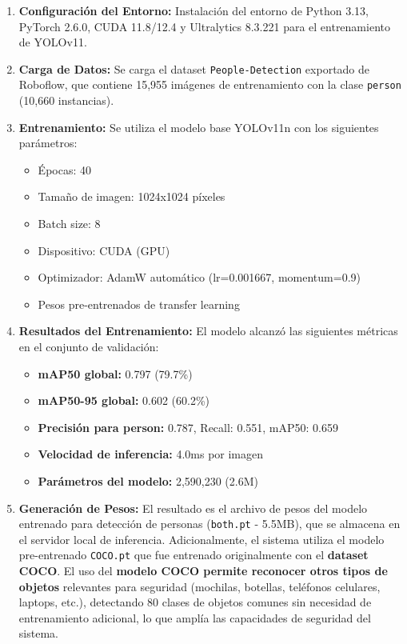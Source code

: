 \documentclass[12pt, a4paper]{article}
\begin{document}
\begin{enumerate}
\item \textbf{Configuración del Entorno:} Instalación del entorno de Python 3.13, PyTorch 2.6.0, CUDA 11.8/12.4 y Ultralytics 8.3.221 para el entrenamiento de YOLOv11.
\item \textbf{Carga de Datos:} Se carga el dataset \texttt{People-Detection} exportado de Roboflow, que contiene 15,955 imágenes de entrenamiento con la clase \texttt{person} (10,660 instancias).
\item \textbf{Entrenamiento:} Se utiliza el modelo base YOLOv11n con los siguientes parámetros:
\begin{itemize}
\item Épocas: 40
\item Tamaño de imagen: 1024x1024 píxeles
\item Batch size: 8
\item Dispositivo: CUDA (GPU)
\item Optimizador: AdamW automático (lr=0.001667, momentum=0.9)
\item Pesos pre-entrenados de transfer learning
\end{itemize}
\item \textbf{Resultados del Entrenamiento:} El modelo alcanzó las siguientes métricas en el conjunto de validación:
\begin{itemize}
\item \textbf{mAP50 global:} 0.797 (79.7\%)
\item \textbf{mAP50-95 global:} 0.602 (60.2\%)
\item \textbf{Precisión para person:} 0.787, Recall: 0.551, mAP50: 0.659
\item \textbf{Velocidad de inferencia:} 4.0ms por imagen
\item \textbf{Parámetros del modelo:} 2,590,230 (2.6M)
\end{itemize}
\item \textbf{Generación de Pesos:} El resultado es el archivo de pesos del modelo entrenado para detección de personas (\texttt{both.pt} - 5.5MB), que se almacena en el servidor local de inferencia. Adicionalmente, el sistema utiliza el modelo pre-entrenado \texttt{COCO.pt} que fue entrenado originalmente con el \textbf{dataset COCO}. El uso del \textbf{modelo COCO permite reconocer otros tipos de objetos} relevantes para seguridad (mochilas, botellas, teléfonos celulares, laptops, etc.), detectando 80 clases de objetos comunes sin necesidad de entrenamiento adicional, lo que amplía las capacidades de seguridad del sistema.
\end{enumerate}
\end{document}
